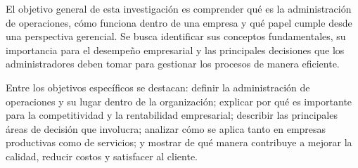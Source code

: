 El objetivo general de esta investigación es comprender qué es la administración de operaciones, cómo funciona dentro de una empresa y qué papel cumple desde una perspectiva gerencial. Se busca identificar sus conceptos fundamentales, su importancia para el desempeño empresarial y las principales decisiones que los administradores deben tomar para gestionar los procesos de manera eficiente.

Entre los objetivos específicos se destacan: definir la administración de operaciones y su lugar dentro de la organización; explicar por qué es importante para la competitividad y la rentabilidad empresarial; describir las principales áreas de decisión que involucra; analizar cómo se aplica tanto en empresas productivas como de servicios; y mostrar de qué manera contribuye a mejorar la calidad, reducir costos y satisfacer al cliente.